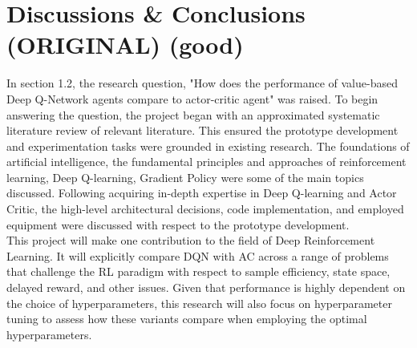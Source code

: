 
\chapter{Discussions \& Conclusions (ORIGINAL) (good)} %



\ifpdf
    \graphicspath{{6_conclusions/figures/PNG/}{6_conclusions/figures/PDF/}{6_conclusions/figures/}}
\else
    \graphicspath{{6_conclusions/figures/EPS/}{6_conclusions/figures/}}
\fi






In section 1.2, the research question, "How does the performance of value-based Deep Q-Network agents compare to actor-critic agent" was raised.
To begin answering the question, the project began with an approximated systematic literature review of relevant literature. 
This ensured the prototype development and experimentation tasks were grounded in existing research. 
The foundations of artificial intelligence, the fundamental principles and approaches of reinforcement learning, Deep Q-learning, Gradient Policy were some of the main topics discussed. Following acquiring in-depth expertise in Deep Q-learning and Actor Critic, the high-level architectural decisions, code implementation, and employed equipment were discussed with respect to the prototype development. \\

This project will make one contribution to the field of Deep Reinforcement Learning.  It will explicitly compare DQN with AC across a range of problems that challenge the RL paradigm with respect to sample efficiency, state space, delayed reward, and other issues. Given that performance is highly dependent on the choice of hyperparameters, this research will also focus on hyperparameter tuning to assess how these variants compare when employing the optimal hyperparameters.




